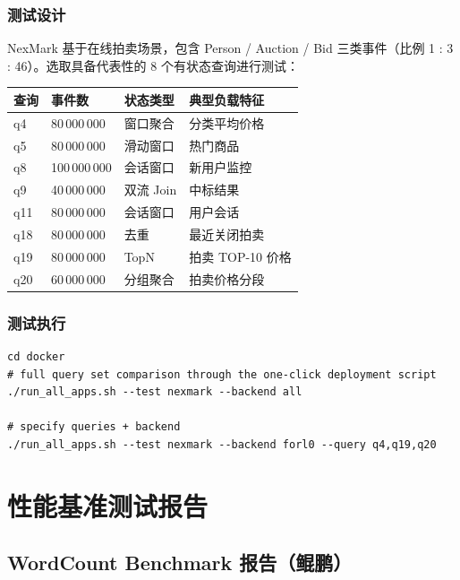 \documentclass[a4paper,11pt]{article}
\begin{document}
\subsubsection{测试设计}

NexMark 基于在线拍卖场景，包含 Person / Auction / Bid 三类事件（比例 1 : 3 : 46）。选取具备代表性的 8 个有状态查询进行测试：

\begin{table}[H]
\centering
\small
\begin{tabularx}{\textwidth}{L{1.2cm} L{3.6cm} L{3.8cm} X}
\toprule
\textbf{查询} & \textbf{事件数} & \textbf{状态类型} & \textbf{典型负载特征} \\
\midrule
q4  & 80\,000\,000  & 窗口聚合            & 分类平均价格 \\
q5  & 80\,000\,000  & 滑动窗口            & 热门商品 \\
q8  & 100\,000\,000 & 会话窗口            & 新用户监控 \\
q9  & 40\,000\,000  & 双流 Join          & 中标结果 \\
q11 & 80\,000\,000  & 会话窗口            & 用户会话 \\
q18 & 80\,000\,000  & 去重                & 最近关闭拍卖 \\
q19 & 80\,000\,000  & TopN                & 拍卖 TOP-10 价格 \\
q20 & 60\,000\,000  & 分组聚合            & 拍卖价格分段 \\
\bottomrule
\end{tabularx}
\end{table}

\subsubsection{测试执行}

\begin{lstlisting}[language=shellcmd]
cd docker
# full query set comparison through the one-click deployment script
./run_all_apps.sh --test nexmark --backend all

# specify queries + backend
./run_all_apps.sh --test nexmark --backend forl0 --query q4,q19,q20
\end{lstlisting}

\section{性能基准测试报告}

\subsection{WordCount Benchmark 报告（鲲鹏）}
\end{document}
